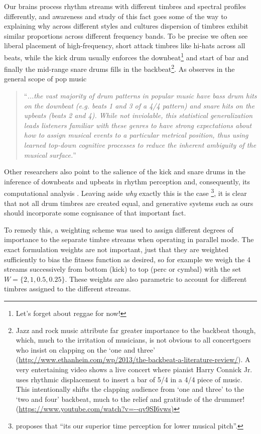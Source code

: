 {{{Our brains process rhythm streams with different timbres and spectral profiles differently, and awareness and study of this fact goes some of the way to explaining why across different styles and cultures dispersion of timbres exhibit similar proportions across different frequency bands. To be precise we often see liberal placement of high-frequency, short attack timbres like hi-hats across all beats, while the kick drum usually enforces the downbeat\footnote{Let's forget about reggae for now!} and start of bar and finally the mid-range snare drums fills in the backbeat\footnote{Jazz and rock music attribute far greater importance to the backbeat though, which, much to the irritation of musicians, is not obvious to all concertgoers who insist on clapping on the `one and three' (\url{http://www.ethanhein.com/wp/2013/the-backbeat-a-literature-review/}). A very entertaining video shows a live concert where pianist Harry Connick Jr. uses rhythmic displacement to insert a bar of 5/4 in a 4/4 piece of music. This intentionally shifts the clapping audience from `one and three' to the `two and four' backbeat, much to the relief and gratitude of the drummer! (\url{https://www.youtube.com/watch?v=--qv9SI6vws)}}. As \cite{Merchant2015} observes in the general scope of pop music 

\blockcquote[]{Merchant2015}{``\textit{...the vast majority of drum patterns in popular music have bass drum hits on the downbeat (e.g. beats 1 and 3 of a 4/4 pattern) and snare hits on the upbeats (beats 2 and 4). While not inviolable, this statistical generalization leads listeners familiar with these genres to have strong expectations about how to assign musical events to a particular metrical position, thus using learned top-down cognitive processes to reduce the inherent ambiguity of the musical surface.}''}

Other researchers also point to the salience of the kick and snare drums in the inference of downbeats and upbeats in rhythm perception and, consequently, its computational analysis \citep{Zils2002, Panteli2014a, Gomez-Marin2017}. Leaving aside \textit{why} exactly this is the case \footnote{\cite{Hove2014} proposes that ``its our superior time perception for lower musical pitch''.}, it is clear that not all drum timbres are created equal, and generative systems such as ours should incorporate some cognisance of that important fact.

To remedy this, a weighting scheme was used to assign different degrees of importance to the separate timbre streams when operating in parallel mode. The exact formulation weights are not important, just that they are weighted sufficiently to bias the fitness function as desired, so for example we weigh the 4 streams successively from bottom (kick) to top (perc or cymbal) with  the set $W = \{2, 1, 0.5, 0.25\}$. These weights are also parametric to account for different timbres assigned to the different streams.

}}}
